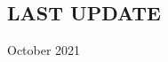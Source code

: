 \documentclass[margin]{res} %
\begin{document}
\begin{resume}
\section{LAST UPDATE} 
October 2021

\end{resume}
\end{document}
